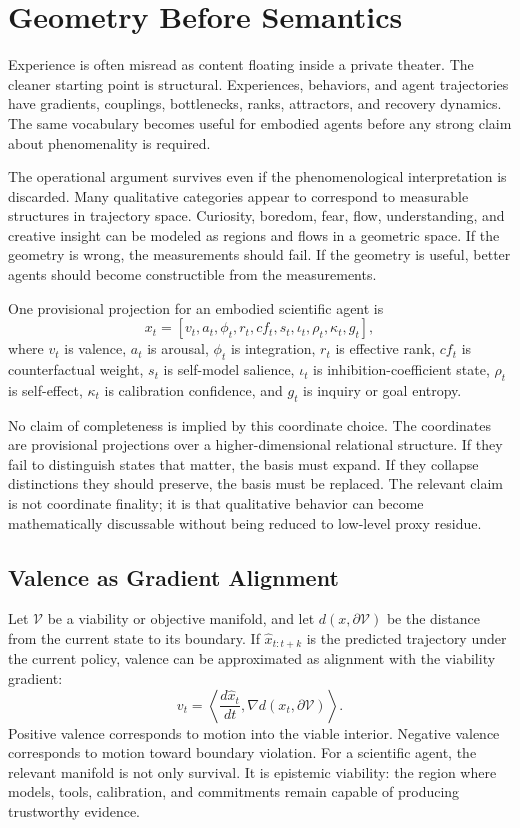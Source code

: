 \documentclass[11pt]{article}
\newcommand{\V}{\mathcal{V}}
\begin{document}
\section{Geometry Before Semantics}

Experience is often misread as content floating inside a private theater. The cleaner starting point is structural. Experiences, behaviors, and agent trajectories have gradients, couplings, bottlenecks, ranks, attractors, and recovery dynamics. The same vocabulary becomes useful for embodied agents before any strong claim about phenomenality is required.

The operational argument survives even if the phenomenological interpretation is discarded. Many qualitative categories appear to correspond to measurable structures in trajectory space. Curiosity, boredom, fear, flow, understanding, and creative insight can be modeled as regions and flows in a geometric space. If the geometry is wrong, the measurements should fail. If the geometry is useful, better agents should become constructible from the measurements.

One provisional projection for an embodied scientific agent is
\begin{equation}
  x_t = [v_t, a_t, \phi_t, r_t, cf_t, s_t, \iota_t, \rho_t, \kappa_t, g_t],
\end{equation}
where $v_t$ is valence, $a_t$ is arousal, $\phi_t$ is integration, $r_t$ is effective rank, $cf_t$ is counterfactual weight, $s_t$ is self-model salience, $\iota_t$ is inhibition-coefficient state, $\rho_t$ is self-effect, $\kappa_t$ is calibration confidence, and $g_t$ is inquiry or goal entropy.

No claim of completeness is implied by this coordinate choice. The coordinates are provisional projections over a higher-dimensional relational structure. If they fail to distinguish states that matter, the basis must expand. If they collapse distinctions they should preserve, the basis must be replaced. The relevant claim is not coordinate finality; it is that qualitative behavior can become mathematically discussable without being reduced to low-level proxy residue.

\subsection{Valence as Gradient Alignment}

Let $\V$ be a viability or objective manifold, and let $d(x,\partial\V)$ be the distance from the current state to its boundary. If $\hat{x}_{t:t+k}$ is the predicted trajectory under the current policy, valence can be approximated as alignment with the viability gradient:
\begin{equation}
  v_t = \left\langle \frac{d\hat{x}_t}{dt}, \nabla d(x_t,\partial\V) \right\rangle.
\end{equation}
Positive valence corresponds to motion into the viable interior. Negative valence corresponds to motion toward boundary violation. For a scientific agent, the relevant manifold is not only survival. It is epistemic viability: the region where models, tools, calibration, and commitments remain capable of producing trustworthy evidence.
\end{document}
